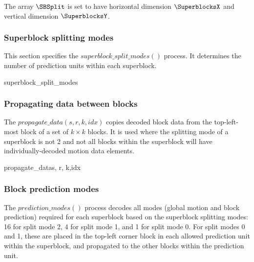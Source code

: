 The array $\SBSplit$ is set to have horizontal dimension $\SuperblocksX$ and vertical dimension $\SuperblocksY$.

\subsubsection{Superblock splitting modes}
\label{superblocksplit}

This section specifies the $superblock\_split\_modes()$ process. It determines the number of prediction units
within each superblock.

\begin{pseudo}{superblock\_split\_modes}{}
    \bsEND
\bsEND
{}
\end{pseudo}

\subsubsection{Propagating data between blocks}
\label{propagatedata}

The $propagate\_data(s, r, k,idx)$ copies decoded block data from the top-left-most block
of a set of $k\times k$ blocks. It is used where the splitting mode of a superblock is not 2 and not all
blocks within the superblock will have individually-decoded motion data elements.

\begin{pseudo}{propagate\_data}{s, r, k,idx}
        \bsCODE{\BlockData[j][i][idx]=\BlockData[s][r][idx]}
    \bsEND
\bsEND
\end{pseudo}

\subsubsection{Block prediction modes}
\label{blockpredmodes}

The $prediction\_modes()$ process decodes all modes (global motion and block prediction) 
required for each superblock based on
the superblock splitting modes: 16 for split mode 2, 4 for split mode 1, and 1 for split mode 0. For split
modes 0 and 1, these are placed in the top-left corner block in each allowed prediction unit within the
superblock, and propagated to the other blocks within the prediction unit.

